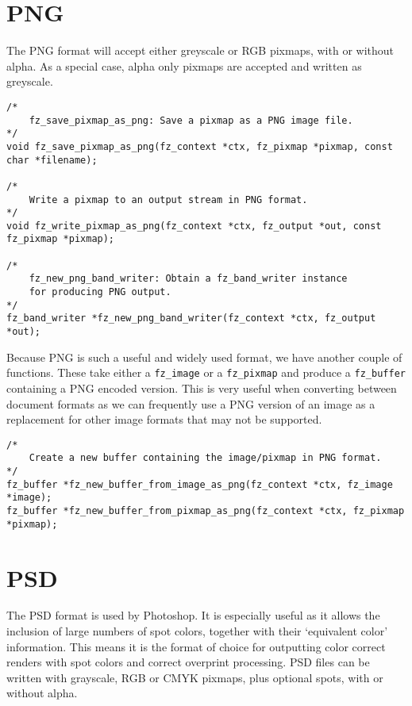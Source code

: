 \documentclass[oneside]{book}
\begin{document}
\section{PNG}

The PNG format will accept either greyscale or RGB pixmaps, with or without alpha. As a special case, alpha only pixmaps are accepted and written as greyscale.

\begin{lstlisting}
/*
	fz_save_pixmap_as_png: Save a pixmap as a PNG image file.
*/
void fz_save_pixmap_as_png(fz_context *ctx, fz_pixmap *pixmap, const char *filename);

/*
	Write a pixmap to an output stream in PNG format.
*/
void fz_write_pixmap_as_png(fz_context *ctx, fz_output *out, const fz_pixmap *pixmap);

/*
	fz_new_png_band_writer: Obtain a fz_band_writer instance
	for producing PNG output.
*/
fz_band_writer *fz_new_png_band_writer(fz_context *ctx, fz_output *out);
\end{lstlisting}

Because PNG is such a useful and widely used format, we have another couple of functions. These take either a \texttt{fz\_image} or a \texttt{fz\_pixmap} and produce a \texttt{fz\_buffer} containing a PNG encoded version. This is very useful when converting between document formats as we can frequently use a PNG version of an image as a replacement for other image formats that may not be supported.

\begin{lstlisting}
/*
	Create a new buffer containing the image/pixmap in PNG format.
*/
fz_buffer *fz_new_buffer_from_image_as_png(fz_context *ctx, fz_image *image);
fz_buffer *fz_new_buffer_from_pixmap_as_png(fz_context *ctx, fz_pixmap *pixmap);
\end{lstlisting}

\section{PSD}

The PSD format is used by Photoshop. It is especially useful as it allows the inclusion of large numbers of spot colors, together with their `equivalent color' information. This means it is the format of choice for outputting color correct renders with spot colors and correct overprint processing. PSD files can be written with grayscale, RGB or CMYK pixmaps, plus optional spots, with or without alpha.
\end{document}
